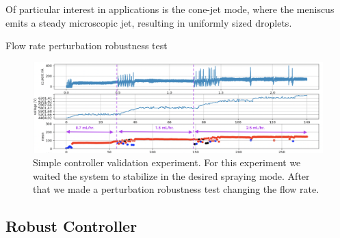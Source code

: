     Of particular interest in applications is the cone-jet mode, where the meniscus emits a steady microscopic jet, resulting in uniformly sized droplets. 

        Flow rate perturbation robustness test

        \begin{figure}[H]
            \center
            \includegraphics[width=17cm]{Figuras/19:03/control_first_results.png}
            \caption{Simple controller validation experiment. For this experiment we waited the system to stabilize in the desired spraying mode. After that we made a perturbation robustness test changing the flow rate.}
        \end{figure}


    \subsection{Robust Controller}

    



\clearpage